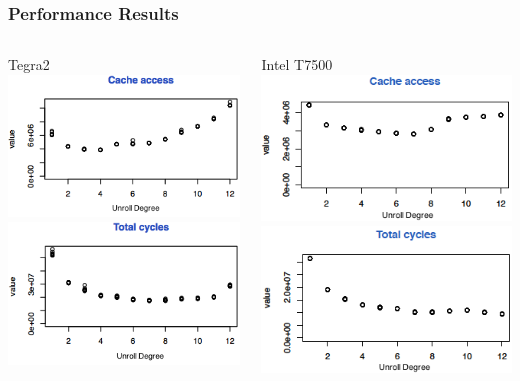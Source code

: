 \documentclass{beamer}
\begin{document}
\begin{frame}
\frametitle{Performance Results}
\centering
\begin{columns}
\column{5cm}
\begin{block}{Tegra2}
\includegraphics[scale=0.4]{cacc}\\
\includegraphics[scale=0.4]{totcyc}
\end{block}
\column{5cm}
\begin{block}{Intel T7500}
\includegraphics[scale=0.4]{nedni_cacc.png}\\
\includegraphics[scale=0.4]{nedni_totcyc.png}
\end{block}
\end{columns}
\end{frame}
\end{document}
